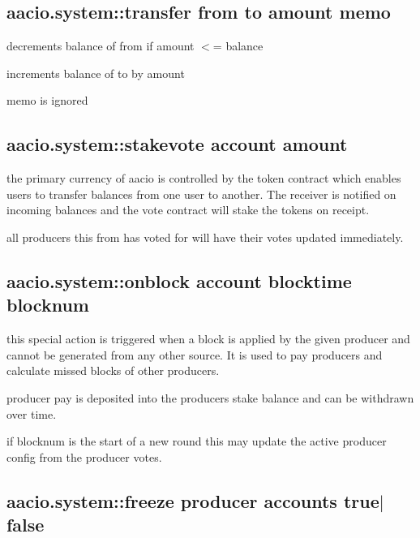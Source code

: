 \subsection*{aacio.\+system\+::transfer from to amount memo}


\begin{DoxyItemize}
\item decrements balance of from if amount $<$= balance
\item increments balance of to by amount
\item memo is ignored
\end{DoxyItemize}

\subsection*{aacio.\+system\+::stakevote account amount}


\begin{DoxyItemize}
\item the primary currency of aacio is controlled by the token contract which enables users to transfer balances from one user to another. The receiver is notified on incoming balances and the vote contract will stake the tokens on receipt.
\item all producers this \textquotesingle{}from\textquotesingle{} has voted for will have their votes updated immediately.
\end{DoxyItemize}

\subsection*{aacio.\+system\+::onblock account blocktime blocknum}


\begin{DoxyItemize}
\item this special action is triggered when a block is applied by the given producer and cannot be generated from any other source. It is used to pay producers and calculate missed blocks of other producers.
\item producer pay is deposited into the producer\textquotesingle{}s stake balance and can be withdrawn over time.
\item if blocknum is the start of a new round this may update the active producer config from the producer votes.
\end{DoxyItemize}

\subsection*{aacio.\+system\+::freeze producer accounts true$\vert$false}


